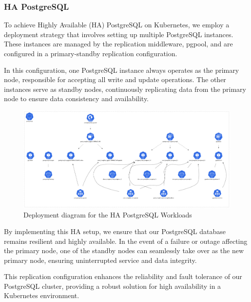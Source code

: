 \subsubsection{HA PostgreSQL }

\hspace{7mm}To achieve Highly Available (HA) PostgreSQL on Kubernetes, we employ a deployment strategy that involves setting up multiple PostgreSQL instances. These instances are managed by the replication middleware, pgpool, and are configured in a primary-standby replication configuration.

\hspace{7mm}In this configuration, one PostgreSQL instance always operates as the primary node, responsible for accepting all write and update operations. The other instances serve as standby nodes, continuously replicating data from the primary node to ensure data consistency and availability.

\begin{figure}[H]\centering
\includegraphics[width=1.0\textwidth,angle=00]{assets/f37.png}
\caption{Deployment diagram for the HA PostgreSQL Workloads}
\label{fig:f37}
\end{figure}

\hspace{7mm}By implementing this HA setup, we ensure that our PostgreSQL database remains resilient and highly available. In the event of a failure or outage affecting the primary node, one of the standby nodes can seamlessly take over as the new primary node, ensuring uninterrupted service and data integrity.

\hspace{7mm}This replication configuration enhances the reliability and fault tolerance of our PostgreSQL cluster, providing a robust solution for high availability in a Kubernetes environment.

\newpage

